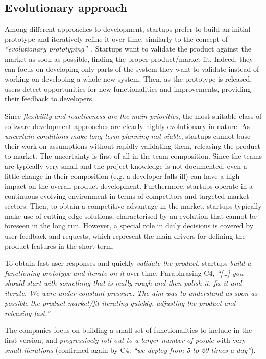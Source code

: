 \documentclass[10pt,journal,letterpaper,compsoc]{IEEEtran}
\begin{document}
\subsection{Evolutionary approach}\label{res:gsm:cat2} 
Among different approaches to development, startups prefer to build an initial 
prototype and iteratively refine it over time, similarly to the concept of
\textit{``evolutionary prototyping''}~\cite{EvProt}. Startups want to validate 
the product against the market as soon as possible, finding the proper 
product/market fit. Indeed, they can focus on developing only parts of the 
system they want to validate instead of working on developing a whole new 
system. Then, as the prototype is released, users detect opportunities for new 
functionalities and improvements, providing their feedback to developers.


Since \textit{flexibility and reactiveness are the main priorities}, the most
suitable class of software development approaches are clearly highly
evolutionary in nature. As \textit{uncertain conditions make long-term
planning not viable}, startups cannot base their work on assumptions without
rapidly validating them, releasing the product to market. The uncertainty is
first of all in the team composition. Since the teams are typically very small
and the project knowledge is not documented, even a little change in their
composition (e.g. a developer falls ill) can have a high impact on the
overall product development. Furthermore, startups operate in a continuous
evolving environment in terms of competitors and targeted market sectors. Then,
to obtain a competitive advantage in the market, startups typically make use of
cutting-edge solutions, characterised by an evolution that cannot be foreseen in
the long run. However, a special role in daily decisions is covered by user
feedback and requests, which represent the main drivers for defining the product
features in the short-term.

To obtain fast user responses and quickly \textit{validate the product},
startups \textit{build a functioning prototype and iterate on it} over time.
Paraphrasing C4, \textit{``[\ldots] you should start with something that is
really rough and then polish it, fix it and iterate. We were under constant
pressure. The aim was to understand as soon as possible the product market/fit
iterating quickly, adjusting the product and releasing fast.''}

The companies focus on building a small set of functionalities to include in
the first version, and \textit{progressively roll-out to a larger number of
people} with very \textit{small iterations} (confirmed again by C4: \textit{``we
deploy from 5 to 20 times a day''}).
\end{document}
